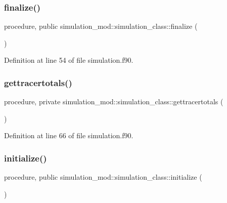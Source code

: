 \subsubsection{\texorpdfstring{finalize()}{finalize()}}
{\footnotesize\ttfamily procedure, public simulation\+\_\+mod\+::simulation\+\_\+class\+::finalize (\begin{DoxyParamCaption}{ }\end{DoxyParamCaption})}



Definition at line 54 of file simulation.\+f90.

\mbox{\label{structsimulation__mod_1_1simulation__class_ab22e46320d4a3dd0f2739894d1165a85}} 
\subsubsection{\texorpdfstring{gettracertotals()}{gettracertotals()}}
{\footnotesize\ttfamily procedure, private simulation\+\_\+mod\+::simulation\+\_\+class\+::gettracertotals (\begin{DoxyParamCaption}{ }\end{DoxyParamCaption})\hspace{0.3cm}{\ttfamily [private]}}



Definition at line 66 of file simulation.\+f90.

\mbox{\label{structsimulation__mod_1_1simulation__class_aa66177f314198046f3e05d9a0a322a22}} 
\subsubsection{\texorpdfstring{initialize()}{initialize()}}
{\footnotesize\ttfamily procedure, public simulation\+\_\+mod\+::simulation\+\_\+class\+::initialize (\begin{DoxyParamCaption}{ }\end{DoxyParamCaption})}



